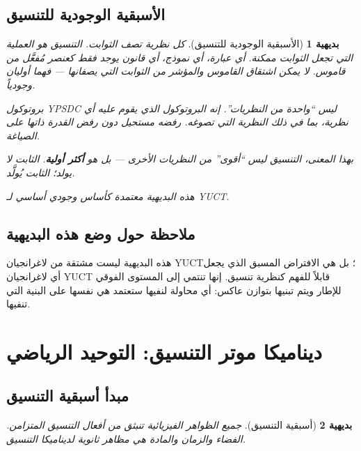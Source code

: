 \documentclass[11pt,a4paper]{article}
\newtheorem{axiom}{بديهية}
\begin{document}
	\subsection{الأسبقية الوجودية للتنسيق}
	\begin{axiom}[الأسبقية الوجودية للتنسيق]
		كل نظرية تصف الثوابت. التنسيق هو العملية التي تجعل الثوابت ممكنة.
		أي عبارة، أي نموذج، أي قانون يوجد فقط كعنصر مُفعَّل من قاموس.
		لا يمكن اشتقاق القاموس والمؤشر من الثوابت التي يصفانها — فهما أوليان وجودياً.
		
		بروتوكول YPSDC ليس ``واحدة من النظريات''.
		إنه البروتوكول الذي يقوم عليه أي نظرية، بما في ذلك النظرية التي تصوغه.
		رفضه مستحيل دون رفض القدرة ذاتها على الصياغة.
		
		بهذا المعنى، التنسيق ليس ``أقوى'' من النظريات الأخرى — بل هو \textbf{أكثر أولية}.
		الثابت لا يولد؛ الثابت يُولَّد.
		
		هذه البديهية معتمدة كأساس وجودي أساسي لـ YUCT.
	\end{axiom}
	\subsection*{ملاحظة حول وضع هذه البديهية}
	هذه البديهية ليست مشتقة من لاغرانجيان YUCT؛ بل هي الافتراض المسبق الذي يجعل أي لاغرانجيان YUCT قابلاً للفهم كنظرية تنسيق. إنها تنتمي إلى المستوى الفوقي للإطار ويتم تبنيها بتوازن عاكس: أي محاولة لنفيها ستعتمد هي نفسها على البنية التي تنفيها.
	
	\section{ديناميكا موتر التنسيق: التوحيد الرياضي}
	\label{sec:ctd-unification}
	
	\subsection{مبدأ أسبقية التنسيق}
	\begin{axiom}[أسبقية التنسيق]
		جميع الظواهر الفيزيائية تنبثق من أفعال التنسيق المتزامن.
		الفضاء والزمان والمادة هي مظاهر ثانوية لديناميكا التنسيق.
	\end{axiom}
	
\end{document}
